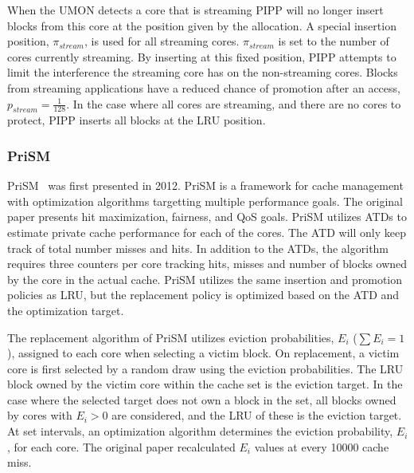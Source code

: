 When the UMON detects a core that is streaming PIPP will no longer insert blocks from this core at the position given by the allocation.
A special insertion position, $\pi_{stream}$, is used for all streaming cores.
$\pi_{stream}$ is set to the number of cores currently streaming. 
By inserting at this fixed position, PIPP attempts to limit the interference the streaming core has on the non-streaming cores.
Blocks from streaming applications have a reduced chance of promotion after an access, $p_{stream} = \frac{1}{128}$.
In the case where all cores are streaming, and there are no cores to protect, PIPP inserts all blocks at the LRU position.

\subsubsection{PriSM}

PriSM~\cite{Manikantan2012} was first presented in 2012.
PriSM is a framework for cache management with optimization algorithms targetting multiple performance goals.
The original paper presents hit maximization, fairness, and QoS goals.
PriSM utilizes ATDs to estimate private cache performance for each of the cores.
The ATD will only keep track of total number misses and hits.
In addition to the ATDs, the algorithm requires three counters per core tracking hits, misses and number of blocks owned by the core in the actual cache.
PriSM utilizes the same insertion and promotion policies as LRU, but the replacement policy is optimized based on the ATD and the optimization target.

The replacement algorithm of PriSM utilizes eviction probabilities, $E_i$ ($\sum{E_i} = 1$), assigned to each core when selecting a victim block.
On replacement, a victim core is first selected by a random draw using the eviction probabilities.
The LRU block owned by the victim core within the cache set is the eviction target.
In the case where the selected target does not own a block in the set, all blocks owned by cores with $E_i > 0$ are considered, and the LRU of these is the eviction target.
At set intervals, an optimization algorithm determines the eviction probability, $E_i$, for each core.
The original paper recalculated $E_i$ values at every 10000 cache miss.


